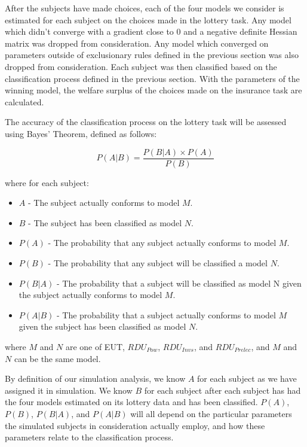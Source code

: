 \documentclass[../main.tex]{subfiles}
\begin{document}
After the subjects have made choices, each of the four models we consider is estimated for each subject on the choices made in the lottery task.
Any model which didn't converge with a gradient close to 0 and a negative definite Hessian matrix was dropped from consideration.
Any model which converged on parameters outside of exclusionary rules defined in the previous section was also dropped from consideration.
Each subject was then classified based on the classification process defined in the previous section.
With the parameters of the winning model, the welfare surplus of the choices made on the insurance task are calculated.

The accuracy of the classification process on the lottery task will be assessed using Bayes' Theorem, defined as follows:

\begin{equation}
	\label{eq4:bayes}
	P(A|B) = \frac{P(B|A) \times P(A)}{P(B)}
\end{equation}

\noindent where for each subject:

\begin{itemize}
	\item $A$ - The subject actually conforms to model $M$.
	\item $B$ - The subject has been classified as model $N$.
	\item $P(A)$ - The probability that any subject actually conforms to model $M$.
	\item $P(B)$ - The probability that any subject will be classified a model $N$.
	\item $P(B|A)$ - The probability that a subject will be classified as model N given the subject actually conforms to model $M$.
	\item $P(A|B)$ - The probability that a subject actually conforms to model $M$ given the subject has been classified as model $N$.
\end{itemize}

\noindent where $M$ and $N$ are one of EUT, $\mathit{RDU_{Pow}}$, $\mathit{RDU_{Invs}}$, and $\mathit{RDU_{Prelec}}$, and $M$ and $N$ can be the same model.

By definition of our simulation analysis, we know $A$ for each subject as we have assigned it in simulation.
We know $B$ for each subject after each subject has had the four models estimated on its lottery data and has been classified.
$P(A)$, $P(B)$, $P(B|A)$, and $P(A|B)$ will all depend on the particular parameters the simulated subjects in consideration actually employ, and how these parameters relate to the classification process.
\end{document}
